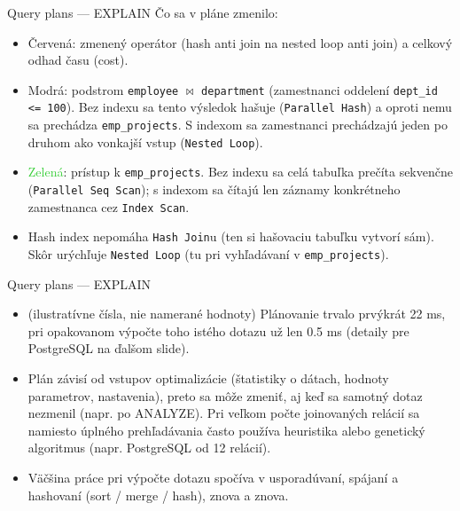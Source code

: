 \documentclass[12pt]{beamer}
\def\blue#1{\textcolor{Cerulean}{#1}}
\def\green#1{\textcolor{LimeGreen}{#1}}
\begin{document}
\begin{frame}[fragile]{Query plans --- EXPLAIN}
Čo sa v pláne zmenilo:
\begin{itemize}
\item \alert{Červená}: zmenený operátor (\alert{hash anti join} na \alert{nested loop anti join}) a celkový odhad času (cost).
\item \blue{Modrá}: podstrom \verb|employee| $\bowtie$ \verb|department| (zamestnanci oddelení \verb|dept_id <= 100|).
Bez indexu sa tento výsledok hašuje (\texttt{Parallel Hash}) a oproti nemu sa prechádza \verb|emp_projects|.
S indexom sa zamestnanci prechádzajú jeden po druhom ako vonkajší vstup (\texttt{Nested Loop}).
\item \green{Zelená}: prístup k \verb|emp_projects|. Bez indexu sa celá tabuľka prečíta sekvenčne (\texttt{Parallel Seq Scan});
s indexom sa čítajú len záznamy konkrétneho zamestnanca cez \texttt{Index Scan}.
\item Hash index nepomáha \texttt{Hash Join}u (ten si hašovaciu tabuľku vytvorí sám). Skôr urýchľuje \texttt{Nested Loop} (tu pri vyhľadávaní v \verb|emp_projects|).
\end{itemize}
\end{frame}

\begin{frame}[fragile]{Query plans --- EXPLAIN}
\begin{itemize}
\item (ilustratívne čísla, nie namerané hodnoty) Plánovanie trvalo prvýkrát 22 ms, pri opakovanom výpočte toho istého dotazu už len 0.5 ms (detaily pre PostgreSQL na ďalšom slide).
\item Plán závisí od vstupov optimalizácie (štatistiky o dátach, hodnoty parametrov, nastavenia),
    preto sa môže zmeniť, aj keď sa samotný dotaz nezmenil (napr. po ANALYZE).
    Pri veľkom počte joinovaných relácií sa namiesto úplného prehľadávania často používa heuristika alebo genetický algoritmus (napr. PostgreSQL od 12 relácií).
\item Väčšina práce pri výpočte dotazu spočíva v usporadúvaní, spájaní a hashovaní (sort / merge / hash), znova a znova.
\end{itemize}
\end{frame}

\end{document}
